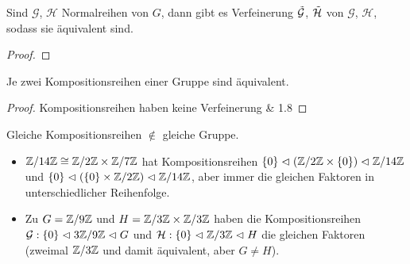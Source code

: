 \documentclass[../main.tex]{subfiles}
\begin{document}
\begin{theorem}
    Sind $\mathcal{G}$, $\mathcal{H}$ Normalreihen von $G$, dann gibt es Verfeinerung $\Tilde{\mathcal{G}}$, $\Tilde{\mathcal{H}}$ von $\mathcal{G}$, $\mathcal{H}$, sodass sie äquivalent sind.
\end{theorem}
\begin{proof}
    \TODO
\end{proof}

\begin{theorem}
    Je zwei Kompositionsreihen einer Gruppe sind äquivalent.
\end{theorem}
\begin{proof}
    Kompositionsreihen haben keine Verfeinerung \& 1.8
\end{proof}
\begin{remark*}
    Gleiche Kompositionsreihen $\notin$ gleiche Gruppe.
\end{remark*}
\begin{example*}
    \begin{itemize}
        \item $\mathbb{Z}/14\mathbb{Z} \cong \mathbb{Z}/2\mathbb{Z} \times \mathbb{Z}/7\mathbb{Z}$ hat Kompositionsreihen $\{0\} \vartriangleleft (\mathbb{Z}/2\mathbb{Z} \times \{0\}) \vartriangleleft \mathbb{Z}/14\mathbb{Z}$ und $\{0\} \vartriangleleft (\{0\} \times \mathbb{Z}/2\mathbb{Z}) \vartriangleleft \mathbb{Z}/14\mathbb{Z}$, aber immer die gleichen Faktoren in unterschiedlicher Reihenfolge.
        \item Zu $G=\mathbb{Z}/9\mathbb{Z}$ und $H=\mathbb{Z}/3\mathbb{Z}\times\mathbb{Z}/3\mathbb{Z}$ haben die Kompositionsreihen $\mathcal{G}: \{0\} \vartriangleleft 3 \mathbb{Z}/9\mathbb{Z} \vartriangleleft G$ und $\mathcal{H}: \{0\} \vartriangleleft \mathbb{Z}/3\mathbb{Z} \vartriangleleft H$ die gleichen Faktoren (zweimal $\mathbb{Z}/3\mathbb{Z}$ und damit äquivalent, aber $G\neq H$).
    \end{itemize}
\end{example*}
    
\end{document}
